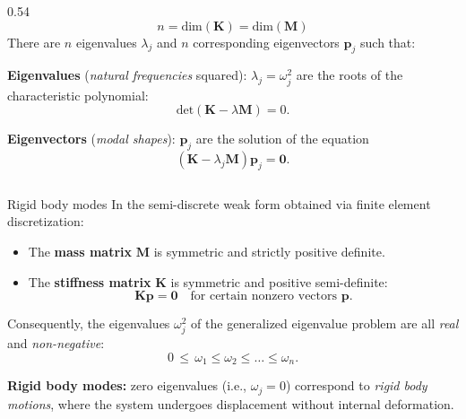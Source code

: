 \documentclass[aspectratio=169]{beamer}
\begin{document}
{\begin{frame}
\begin{columns}
\begin{column}{0.54\textwidth}
        $$n=\text{dim}(\mathbf K)=\text{dim}(\mathbf M)$$
        There are $n$ eigenvalues $\lambda_j$ and $n$ corresponding eigenvectors $\mathbf p_j$ such that:
        \begin{block}{}
          \textbf{Eigenvalues} (\emph{natural frequencies} squared): $\lambda_j=\omega_j^2$ are the roots of the characteristic polynomial:
          $$\text{det}(\mathbf K-\lambda\mathbf M)=0.$$
        \end{block}
        \begin{block}{}
          \textbf{Eigenvectors} (\emph{modal shapes}): $\mathbf p_j$ are the solution of the equation
          $$(\mathbf{K} - \lambda_j \mathbf{M})\mathbf p_j=\mathbf 0.$$
        \end{block}
      \end{column}
    \end{columns}
  \end{frame}


  \begin{frame}{Rigid body modes}
    In the semi-discrete weak form obtained via finite element discretization:
    \begin{itemize}
      \item The \textbf{mass matrix} \( \mathbf{M} \) is symmetric and strictly positive definite.
      \item The \textbf{stiffness matrix} \( \mathbf{K} \) is symmetric and positive semi-definite:
            \[
              \mathbf{K} \mathbf{p} = \mathbf{0} \quad \text{for certain nonzero vectors } \mathbf{p}.
            \]
    \end{itemize}
    Consequently, the eigenvalues \( \omega_j^2 \) of the generalized eigenvalue problem are all \emph{real} and \emph{non-negative}:
    \[
      0 \,\leq\, \omega_1 \leq \omega_2 \leq \dots \leq \omega_n.
    \]

    \begin{block}{}
      \textbf{Rigid body modes:} zero eigenvalues (i.e., \( \omega_j = 0 \)) correspond to \emph{rigid body motions}, where the system undergoes displacement without internal deformation.
    \end{block}
  \end{frame}

}
\end{document}
